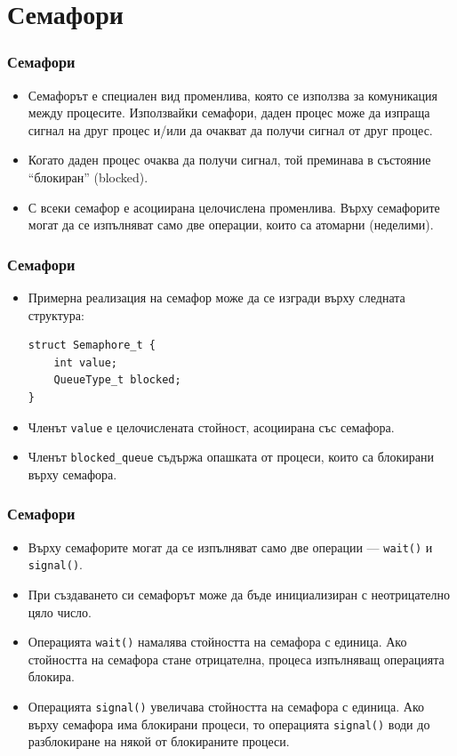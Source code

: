 \documentclass[ignorenonframetext, hyperref=unicode]{beamer}
\begin{document}
\section{Семафори}

\begin{frame}[containsverbatim]
\frametitle{Семафори}
\begin{itemize}
\item Семафорът е специален вид променлива, която се използва за комуникация
между процесите. Използвайки семафори, даден процес може да изпраща
сигнал на друг процес и/или да очакват да получи сигнал от друг процес.
\item Когато даден процес очаква да получи сигнал, той преминава в състояние
``блокиран'' (blocked).
\item С всеки семафор е асоциирана целочислена променлива. Върху семафорите
могат да се изпълняват само две операции, които са атомарни (неделими).
\end{itemize}
\end{frame}

\begin{frame}[containsverbatim]
\frametitle{Семафори}
\begin{itemize}
\item Примерна реализация на семафор може да се изгради върху следната
структура:
\begin{lstlisting}
struct Semaphore_t {
	int value;
	QueueType_t blocked;
} 
\end{lstlisting}
\item Членът \lstinline{value} е целочислената стойност, асоциирана със
семафора.
\item Членът \lstinline{blocked_queue} съдържа опашката от процеси, които са
блокирани върху семафора.
\end{itemize}
\end{frame}

\begin{frame}[containsverbatim]
\frametitle{Семафори}
\begin{itemize}
\item Върху семафорите могат да се изпълняват само две операции —
\lstinline{wait()} и \lstinline{signal()}.
\item При създаването си семафорът може да бъде инициализиран с неотрицателно
цяло число.
\item Операцията \lstinline{wait()} намалява стойността на семафора с единица.
Ако стойността на семафора стане отрицателна, процеса изпълняващ операцията
блокира.
\item Операцията \lstinline{signal()} увеличава стойността на семафора с
единица. Ако върху семафора има блокирани процеси, то операцията
\lstinline{signal()} води до разблокиране на някой от блокираните процеси.
\end{itemize}
\end{frame}
\end{document}
